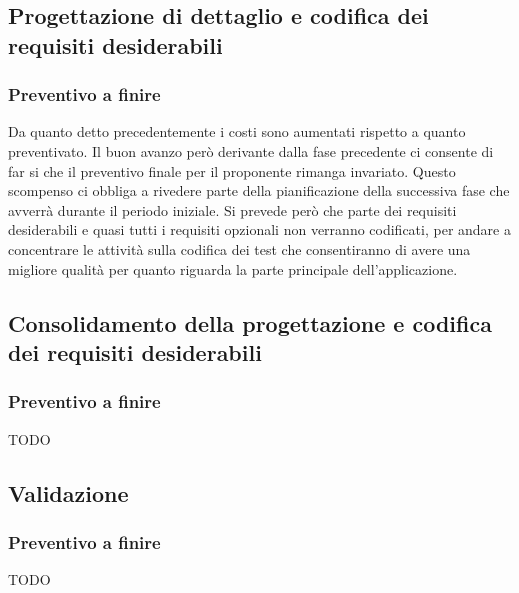 		\subsection{Progettazione di dettaglio e codifica dei requisiti desiderabili} %

			\subsubsection{Preventivo a finire} %
			Da quanto detto precedentemente i costi sono aumentati rispetto a quanto preventivato. Il buon avanzo però derivante dalla fase precedente ci consente di far si che il preventivo finale per il proponente rimanga invariato.
			Questo scompenso ci obbliga a rivedere parte della pianificazione della successiva fase che avverrà durante il periodo iniziale. \newline
			Si prevede però che parte dei requisiti desiderabili e quasi tutti i requisiti opzionali non verranno codificati, per andare a concentrare le attività sulla codifica dei test che consentiranno di avere una migliore qualità per quanto riguarda la parte principale dell'applicazione.


		\subsection{Consolidamento della progettazione e codifica dei requisiti desiderabili} %

			\subsubsection{Preventivo a finire} %
			TODO

		\subsection{Validazione} %

			\subsubsection{Preventivo a finire} %
			TODO

